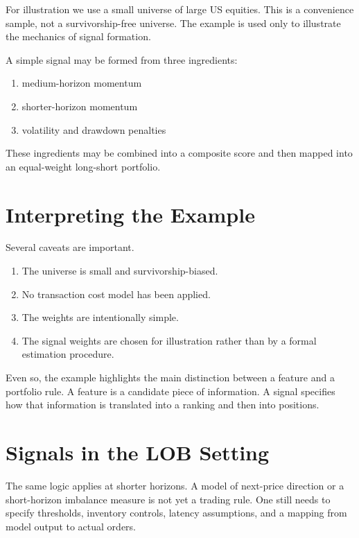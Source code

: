\documentclass[11pt]{article}
\begin{document}
For illustration we use a small universe of large US equities. This is a
convenience sample, not a survivorship-free universe. The example is used only
to illustrate the mechanics of signal formation.

A simple signal may be formed from three ingredients:

\begin{enumerate}
  \item medium-horizon momentum
  \item shorter-horizon momentum
  \item volatility and drawdown penalties
\end{enumerate}

These ingredients may be combined into a composite score and then mapped into
an equal-weight long-short portfolio.

\section*{Interpreting the Example}

Several caveats are important.

\begin{enumerate}
  \item The universe is small and survivorship-biased.
  \item No transaction cost model has been applied.
  \item The weights are intentionally simple.
  \item The signal weights are chosen for illustration rather than by a formal estimation procedure.
\end{enumerate}

Even so, the example highlights the main distinction between a feature and a
portfolio rule. A feature is a candidate piece of information. A signal
specifies how that information is translated into a ranking and then into
positions.

\newpage

\section*{Signals in the LOB Setting}

The same logic applies at shorter horizons. A model of next-price direction or
a short-horizon imbalance measure is not yet a trading rule. One still needs to
specify thresholds, inventory controls, latency assumptions, and a mapping from
model output to actual orders.
\end{document}
